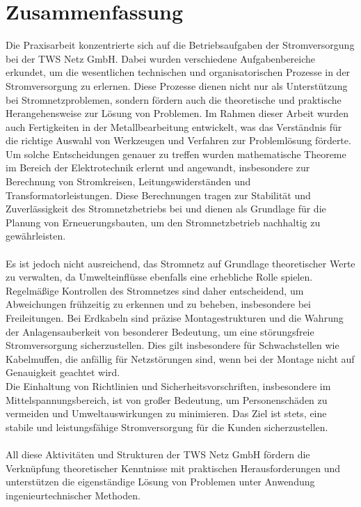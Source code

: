 \chapter{Zusammenfassung}
\label{cha:zusammenfassung}

Die Praxisarbeit konzentrierte sich auf die Betriebsaufgaben der Stromversorgung bei der TWS Netz GmbH. Dabei wurden verschiedene Aufgabenbereiche erkundet, 
um die wesentlichen technischen und organisatorischen Prozesse in der Stromversorgung zu erlernen. Diese Prozesse dienen nicht nur als Unterstützung bei 
Stromnetzproblemen, sondern fördern auch die theoretische und praktische Herangehensweise zur Lösung von Problemen. Im Rahmen dieser Arbeit wurden auch 
Fertigkeiten in der Metallbearbeitung entwickelt, was das Verständnis für die richtige Auswahl von Werkzeugen und Verfahren zur Problemlösung förderte. 
Um solche Entscheidungen genauer zu treffen wurden mathematische Theoreme im Bereich der Elektrotechnik erlernt und angewandt, insbesondere zur Berechnung von 
Stromkreisen, Leitungswiderständen und Transformatorleistungen. Diese Berechnungen tragen zur Stabilität und Zuverlässigkeit des Stromnetzbetriebs bei und 
dienen als Grundlage für die Planung von Erneuerungsbauten, um den Stromnetzbetrieb nachhaltig zu gewährleisten. 
\\\\
Es ist jedoch nicht ausreichend, das Stromnetz auf Grundlage theoretischer Werte zu verwalten, da Umwelteinflüsse ebenfalls eine erhebliche Rolle spielen. 
Regelmäßige Kontrollen des Stromnetzes sind daher entscheidend, um Abweichungen frühzeitig zu erkennen und zu beheben, insbesondere bei Freileitungen. Bei 
Erdkabeln sind präzise Montagestrukturen und die Wahrung der Anlagensauberkeit von besonderer Bedeutung, um eine störungsfreie Stromversorgung sicherzustellen. 
Dies gilt insbesondere für Schwachstellen wie Kabelmuffen, die anfällig für Netzstörungen sind, wenn bei der Montage nicht auf Genauigkeit geachtet wird. 
\\
Die Einhaltung von Richtlinien und Sicherheitsvorschriften, insbesondere im Mittelspannungsbereich, ist von großer Bedeutung, um Personenschäden zu vermeiden 
und Umweltauswirkungen zu minimieren. Das Ziel ist stets, eine stabile und leistungsfähige Stromversorgung für die Kunden sicherzustellen. 
\\\\
All diese Aktivitäten und Strukturen der TWS Netz GmbH fördern die Verknüpfung theoretischer Kenntnisse mit praktischen Herausforderungen und unterstützen 
die eigenständige Lösung von Problemen unter Anwendung ingenieurtechnischer Methoden.

\clearpage
